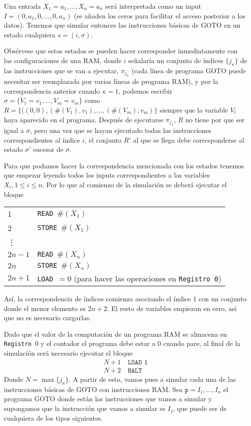 \documentclass[twoside]{article}
\begin{document}
Una entrada $X_1=a_1,\dots, X_n=a_n$ será interpretada como un input $I=(0,a_1,0,\dots,0, a_n)$ (se añaden los ceros para facilitar el acceso posterior a los datos). Tenemos que simular entonces las instrucciones básicas de GOTO en un estado cualquiera $s=(i,\sigma)$. 

Obsérvese que estos estados se pueden hacer corresponder inmediatamente con las configuraciones de una RAM, donde $i$ señalaría un conjunto de índices $\{j_\kappa\}$ de las instrucciones que se van a ejecutar, $\pi_{j_\kappa}$ (cada línea de programa GOTO puede necesitar ser reemplazada por varias líneas de programa RAM), y por la correspondencia anterior cuando $\kappa=1$, podemos escribir $\sigma=\{V_1=v_1,\dots,V_m=v_m\}$ como $R=\{((0,0),(\#(V_1),v_1),\dots,(\#(V_m),v_m)\}$ siempre que la variable $V_l$ haya aparecido en el programa. Después de ejecutarse $\pi_{j_1}$, $R$ no tiene por que ser igual a $\sigma$, pero una vez que se hayan ejecutado todas las instrucciones correspondientes al índice $i$, el conjunto $R'$ al que se llega debe corresponderse al estado $\sigma'$ sucesor de $\sigma$. 

Para que podamos hacer la correspondencia mencionada con los estados tenemos que empezar leyendo todos los inputs correspondientes a las variables $X_i, 1\leq i\leq n$. Por lo que al comienzo de la simulación se deberá ejecutar el bloque

\begin{tabular}{l l}
1 & \texttt{READ }$\#(X_1)$\\
2 & \texttt{STORE }$\#(X_1)$\\
\vdots & \\
$2n-1$ & \texttt{READ }$\#(X_n)$\\
$2n$ & \texttt{STORE }$\#(X_n)$\\
$2n+1$ & \texttt{LOAD }$=0$ (para hacer las operaciones en \texttt{Registro 0})
\end{tabular}

\vspace{0.5cm}

Así, la correspondencia de índices comienza asociando el índice 1 con un conjunto donde el menor elemento es $2n+2$. El resto de variables empiezan en cero, así que no es necesario cargarlas.

\newpage

Dado que el valor de la computación de un programa RAM se almacena en \texttt{Registro }0 y el contador el programa debe estar a 0 cuando pare, al final de la simulación será necesario ejecutar el bloque
\begin{align*}
N+1\ &\texttt{LOAD 1}\\
N+2\ &\texttt{HALT}
\end{align*}
Donde $N=\max\{j_\kappa\}$. A partir de esto, vamos pues a simular cada una de las instrucciones básicas de GOTO con instrucciones RAM. Sea $\texttt{p}=I_1,\dots,I_n$ el programa GOTO donde están las instrucciones que vamos a simular y supongamos que la instrucción que vamos a simular es $I_j$, que puede ser de cualquiera de los tipos siguientes. 
\end{document}
